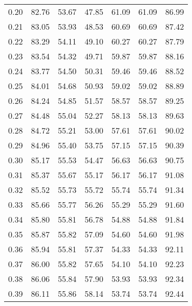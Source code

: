 \begin{tabular}{|c|c|c|c|c|c|c|}
      0.20 &     82.76 &     53.67 &      47.85 &   61.09 &      61.09 &         86.99 \\
      0.21 &     83.05 &     53.93 &      48.53 &   60.69 &      60.69 &         87.42 \\
      0.22 &     83.29 &     54.11 &      49.10 &   60.27 &      60.27 &         87.79 \\
      0.23 &     83.54 &     54.32 &      49.71 &   59.87 &      59.87 &         88.16 \\
      0.24 &     83.77 &     54.50 &      50.31 &   59.46 &      59.46 &         88.52 \\
      0.25 &     84.01 &     54.68 &      50.93 &   59.02 &      59.02 &         88.89 \\
      0.26 &     84.24 &     54.85 &      51.57 &   58.57 &      58.57 &         89.25 \\
      0.27 &     84.48 &     55.04 &      52.27 &   58.13 &      58.13 &         89.63 \\
      0.28 &     84.72 &     55.21 &      53.00 &   57.61 &      57.61 &         90.02 \\
      0.29 &     84.96 &     55.40 &      53.75 &   57.15 &      57.15 &         90.39 \\
      0.30 &     85.17 &     55.53 &      54.47 &   56.63 &      56.63 &         90.75 \\
      0.31 &     85.37 &     55.67 &      55.17 &   56.17 &      56.17 &         91.08 \\
      0.32 &     85.52 &     55.73 &      55.72 &   55.74 &      55.74 &         91.34 \\
      0.33 &     85.66 &     55.77 &      56.26 &   55.29 &      55.29 &         91.60 \\
      0.34 &     85.80 &     55.81 &      56.78 &   54.88 &      54.88 &         91.84 \\
      0.35 &     85.87 &     55.82 &      57.09 &   54.60 &      54.60 &         91.98 \\
      0.36 &     85.94 &     55.81 &      57.37 &   54.33 &      54.33 &         92.11 \\
      0.37 &     86.00 &     55.82 &      57.65 &   54.10 &      54.10 &         92.23 \\
      0.38 &     86.06 &     55.84 &      57.90 &   53.93 &      53.93 &         92.34 \\
      0.39 &     86.11 &     55.86 &      58.14 &   53.74 &      53.74 &         92.44 \\

\end{tabular}
